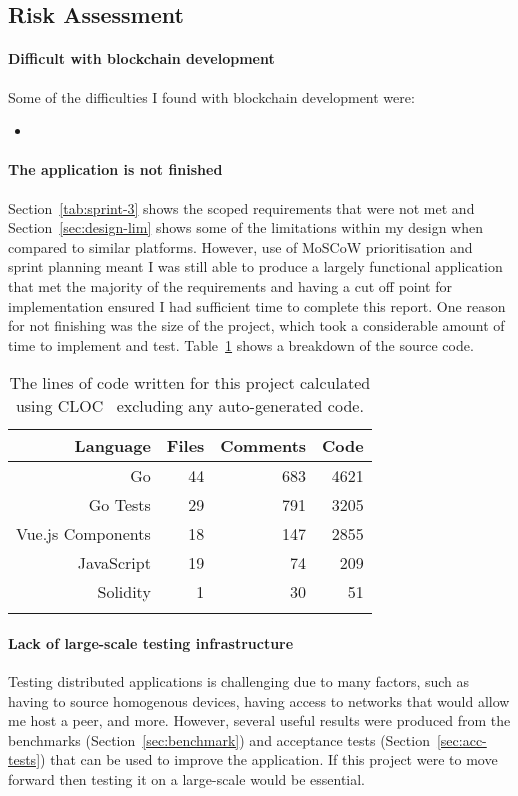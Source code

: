 \subsection*{Risk Assessment}

\paragraph*{Difficult with blockchain development}

Some of the difficulties I found with blockchain development were:

\begin{itemize}
  \item 
\end{itemize}

\paragraph*{The application is not finished}
Section~\ref{tab:sprint-3} shows the scoped requirements that were not met and Section~\ref{sec:design-lim} shows some of the limitations within my design when compared to similar platforms. However, use of MoSCoW prioritisation and sprint planning meant I was still able to produce a largely functional application that met the majority of the requirements and having a cut off point for implementation ensured I had sufficient time to complete this report.
\x
One reason for not finishing was the size of the project, which took a considerable amount of time to implement and test. Table~\ref{tab:cloc} shows a breakdown of the source code.

\begin{longtable}{ r r r r }
  \toprule
  \textbf{Language} & \textbf{Files} & \textbf{Comments} & \textbf{Code}
  \\\midrule\midrule
  Go
  & 44
  & 683
  & 4621
  \\
  Go Tests
  & 29
  & 791
  & 3205
  \\
  Vue.js Components
  & 18
  & 147
  & 2855
  \\
  JavaScript
  & 19
  & 74
  & 209
  \\
  Solidity
  & 1
  & 30
  & 51
  \\\bottomrule\bottomrule
  \caption{The lines of code written for this project calculated using CLOC~\cite{noauthor_aldanialcloc_nodate} excluding any auto-generated code.}
  \label{tab:cloc}
\end{longtable}

\paragraph*{Lack of large-scale testing infrastructure}
Testing distributed applications is challenging due to many factors, such as having to source homogenous devices, having access to networks that would allow me host a peer, and more. However, several useful results were produced from the benchmarks (Section~\ref{sec:benchmark}) and acceptance tests (Section~\ref{sec:acc-tests}) that can be used to improve the application. If this project were to move forward then testing it on a large-scale would be essential.